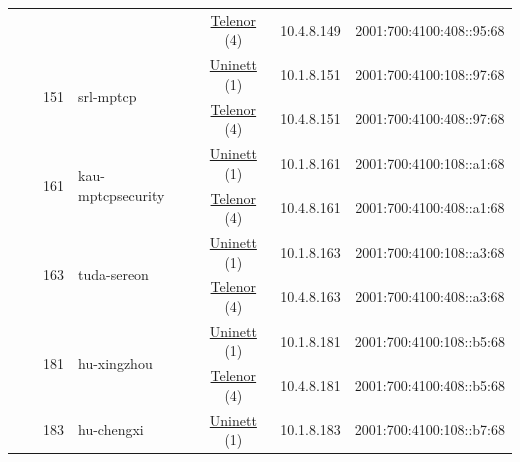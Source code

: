 \begin{small}
\begin{center}
\begin{longtable}{|c|c|c|c|c|c|c|c|}
  &  &  &  & \multicolumn{2}{|c|}{\tiny{\href{https://www.telenor.no}{Telenor} (4)}} & \tiny{10.4.8.149} & \tiny{2001:700:4100:408::95:68} \\* \cline{3-3}\cline{4-4}\cline{5-5}\cline{6-6}\cline{7-7}\cline{8-8}
  &  & \multirow{2}{*}{\tiny{151}} & \multicolumn{1}{|l|}{\multirow{2}{*}{\tiny{srl-mptcp}}} & \multicolumn{2}{|c|}{\tiny{\href{https://www.uninett.no}{Uninett} (1)}} & \tiny{10.1.8.151} & \tiny{2001:700:4100:108::97:68} \\* \cline{5-5}\cline{6-6}\cline{7-7}\cline{8-8}
  &  &  &  & \multicolumn{2}{|c|}{\tiny{\href{https://www.telenor.no}{Telenor} (4)}} & \tiny{10.4.8.151} & \tiny{2001:700:4100:408::97:68} \\* \cline{3-3}\cline{4-4}\cline{5-5}\cline{6-6}\cline{7-7}\cline{8-8}
  &  & \multirow{2}{*}{\tiny{161}} & \multicolumn{1}{|l|}{\multirow{2}{*}{\tiny{kau-mptcpsecurity}}} & \multicolumn{2}{|c|}{\tiny{\href{https://www.uninett.no}{Uninett} (1)}} & \tiny{10.1.8.161} & \tiny{2001:700:4100:108::a1:68} \\* \cline{5-5}\cline{6-6}\cline{7-7}\cline{8-8}
  &  &  &  & \multicolumn{2}{|c|}{\tiny{\href{https://www.telenor.no}{Telenor} (4)}} & \tiny{10.4.8.161} & \tiny{2001:700:4100:408::a1:68} \\* \cline{3-3}\cline{4-4}\cline{5-5}\cline{6-6}\cline{7-7}\cline{8-8}
  &  & \multirow{2}{*}{\tiny{163}} & \multicolumn{1}{|l|}{\multirow{2}{*}{\tiny{tuda-sereon}}} & \multicolumn{2}{|c|}{\tiny{\href{https://www.uninett.no}{Uninett} (1)}} & \tiny{10.1.8.163} & \tiny{2001:700:4100:108::a3:68} \\* \cline{5-5}\cline{6-6}\cline{7-7}\cline{8-8}
  &  &  &  & \multicolumn{2}{|c|}{\tiny{\href{https://www.telenor.no}{Telenor} (4)}} & \tiny{10.4.8.163} & \tiny{2001:700:4100:408::a3:68} \\* \cline{3-3}\cline{4-4}\cline{5-5}\cline{6-6}\cline{7-7}\cline{8-8}
  &  & \multirow{2}{*}{\tiny{181}} & \multicolumn{1}{|l|}{\multirow{2}{*}{\tiny{hu-xingzhou}}} & \multicolumn{2}{|c|}{\tiny{\href{https://www.uninett.no}{Uninett} (1)}} & \tiny{10.1.8.181} & \tiny{2001:700:4100:108::b5:68} \\* \cline{5-5}\cline{6-6}\cline{7-7}\cline{8-8}
  &  &  &  & \multicolumn{2}{|c|}{\tiny{\href{https://www.telenor.no}{Telenor} (4)}} & \tiny{10.4.8.181} & \tiny{2001:700:4100:408::b5:68} \\* \cline{3-3}\cline{4-4}\cline{5-5}\cline{6-6}\cline{7-7}\cline{8-8}
  &  & \multirow{2}{*}{\tiny{183}} & \multicolumn{1}{|l|}{\multirow{2}{*}{\tiny{hu-chengxi}}} & \multicolumn{2}{|c|}{\tiny{\href{https://www.uninett.no}{Uninett} (1)}} & \tiny{10.1.8.183} & \tiny{2001:700:4100:108::b7:68} \\* \cline{5-5}\cline{6-6}\cline{7-7}\cline{8-8}

\end{longtable}
\end{center}
\end{small}
